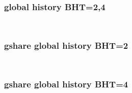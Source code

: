 \documentclass[a4paper,12pt]{article}
\begin{document}
\subsubsection*{global history BHT=2,4}
\inputminted[linenos,fontsize=\scriptsize,frame=leftline]{cpp}{files/src-C2-hybrid_GH2_GH4_predictor.cpp}
\inputminted[linenos,fontsize=\scriptsize,frame=leftline]{cpp}{files/src-C2-hybrid_GH2_GH4_predictor.h}

\subsubsection*{gshare global history BHT=2}
\inputminted[linenos,fontsize=\scriptsize,frame=leftline]{cpp}{files/src-C2-hybrid_GS_GH2_predictor.cpp}
\inputminted[linenos,fontsize=\scriptsize,frame=leftline]{cpp}{files/src-C2-hybrid_GS_GH2_predictor.h}

\subsubsection*{gshare global history BHT=4}
\inputminted[linenos,fontsize=\scriptsize,frame=leftline]{cpp}{files/src-C2-hybrid_GS_GH4_predictor.cpp}
\inputminted[linenos,fontsize=\scriptsize,frame=leftline]{cpp}{files/src-C2-hybrid_GS_GH4_predictor.h}


\end{document}
